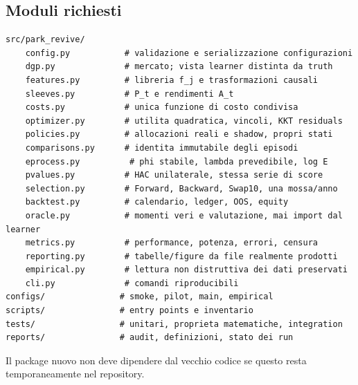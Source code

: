 \documentclass[11pt,a4paper]{article}
\theoremstyle{definition}\newtheorem{definition}[theorem]{Definizione}
\theoremstyle{remark}\newtheorem{remark}[theorem]{Osservazione}
\begin{document}
\subsection{Moduli richiesti}
\begin{lstlisting}
src/park_revive/
    config.py           # validazione e serializzazione configurazioni
    dgp.py              # mercato; vista learner distinta da truth
    features.py         # libreria f_j e trasformazioni causali
    sleeves.py          # P_t e rendimenti A_t
    costs.py            # unica funzione di costo condivisa
    optimizer.py        # utilita quadratica, vincoli, KKT residuals
    policies.py         # allocazioni reali e shadow, propri stati
    comparisons.py      # identita immutabile degli episodi
    eprocess.py          # phi stabile, lambda prevedibile, log E
    pvalues.py          # HAC unilaterale, stessa serie di score
    selection.py        # Forward, Backward, Swap10, una mossa/anno
    backtest.py         # calendario, ledger, OOS, equity
    oracle.py           # momenti veri e valutazione, mai import dal learner
    metrics.py          # performance, potenza, errori, censura
    reporting.py        # tabelle/figure da file realmente prodotti
    empirical.py        # lettura non distruttiva dei dati preservati
    cli.py              # comandi riproducibili
configs/               # smoke, pilot, main, empirical
scripts/               # entry points e inventario
tests/                 # unitari, proprieta matematiche, integration
reports/               # audit, definizioni, stato dei run
\end{lstlisting}
Il package nuovo non deve dipendere dal vecchio codice se questo resta temporaneamente nel repository.
\end{document}
